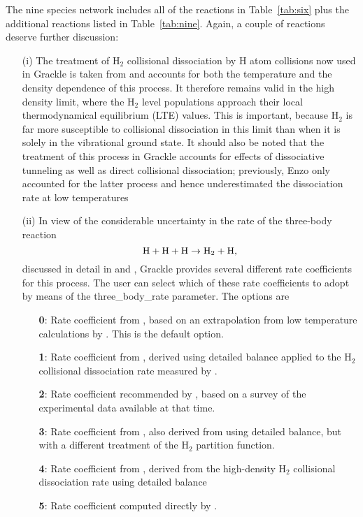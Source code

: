 The nine species network includes all of the reactions in Table~\ref{tab:six} plus the additional reactions listed in Table~\ref{tab:nine}. Again,
a couple of reactions deserve further discussion:
\begin{enumerate}
\item[(i)] The treatment of H$_{2}$ collisional dissociation by H atom collisions now used in Grackle is taken from \citet{1996ApJ...461..265M} and 
accounts for both the temperature and the density dependence of this process. It therefore remains valid in the high density limit, where the H$_{2}$
level populations approach their local thermodynamical equilibrium (LTE) values. This is important, because H$_{2}$ is far more susceptible to
collisional dissociation in this limit than when it is solely in the vibrational ground state. It should also be noted that the treatment of this process
in Grackle accounts for effects of dissociative tunneling as well as direct collisional dissociation; previously, Enzo only accounted for the latter
process and hence underestimated the dissociation rate at low temperatures \citep{2014MNRAS.443.1979L,2015MNRAS.451.2082G}
\item[(ii)] In view of the considerable uncertainty in the rate of the three-body reaction
\begin{equation}
{\rm H + H + H} \rightarrow {\rm H_{2} + H},
\end{equation}
discussed in detail in \citet{2008AIPC..990...25G} and \citet{2011ApJ...726...55T}, Grackle provides several different rate coefficients for this process. The user can
select which of these rate coefficients to adopt by means of the three\_body\_rate parameter. The options are
\begin{enumerate}
\item[{\bf 0}:]  Rate coefficient from \citet{2002Sci...295...93A}, based on an extrapolation from low temperature calculations by \citet{1987JChPh..87..314O}. This is the default option.
\item[{\bf 1}:]  Rate coefficient from \citet{1983ApJ...271..632P}, derived using detailed balance applied to the H$_{2}$ collisional dissociation rate measured by \citet{1967JChPh..47...54J}.
\item[{\bf 2}:]  Rate coefficient recommended by \citet{1983JPCRD..12..531C}, based on a survey of the experimental data available at that time. 
\item[{\bf 3}:]  Rate coefficient from \citet{2007MNRAS.377..705F}, also derived from \citet{1967JChPh..47...54J} using detailed balance, but with a different treatment of the H$_{2}$ partition
function. 
\item[{\bf 4}:]  Rate coefficient from \citet{2008AIPC..990...25G}, derived from the \citet{1996ApJ...461..265M} high-density H$_2$ collisional dissociation rate using detailed balance
\item[{\bf 5}:]  Rate coefficient computed directly by \citet{2013ApJ...773L..25F}.
\end{enumerate}
\end{enumerate}

